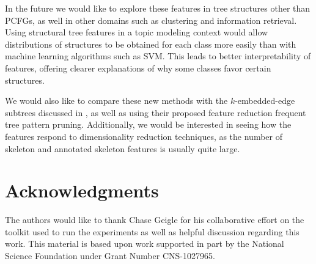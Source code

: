 \documentclass[conference]{IEEEtran}
\begin{document}
In the future we would like to explore these features in tree structures other
than PCFGs, as well in other domains such as clustering and information
retrieval.  Using structural tree features in a topic modeling context would
allow distributions of structures to be obtained for each class more easily than
with machine learning algorithms such as SVM\@. This leads to better
interpretability of features, offering clearer explanations of why some classes
favor certain structures.

We would also like to compare these new methods with the $k$-embedded-edge
subtrees discussed in \cite{sigir-kim-2011}, as well as using their proposed
feature reduction frequent tree pattern pruning. Additionally, we would be
interested in seeing how the features respond to dimensionality reduction
techniques, as the number of skeleton and annotated skeleton features is usually
quite large.

\section*{Acknowledgments}

The authors would like to thank Chase Geigle for his collaborative effort on the
toolkit used to run the experiments as well as helpful discussion regarding this
work. This material is based upon work supported in part by the National Science
Foundation under Grant Number CNS-1027965.

\newpage


\newpage

\end{document}
